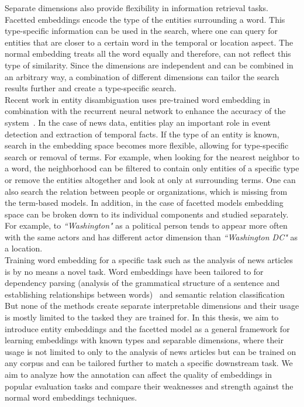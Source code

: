 Separate dimensions also provide flexibility in information retrieval tasks. Facetted embeddings encode the type of the entities surrounding a word. This type-specific information can be used in the search, where one can query for entities that are closer to a certain word in the temporal or location aspect. The normal embedding treats all the word equally and therefore, can not reflect this type of similarity. Since the dimensions are independent and can be combined in an arbitrary way, a combination of different dimensions can tailor the search results further and create a type-specific search. \\
Recent work in entity disambiguation uses pre-trained word embedding in combination with the recurrent neural network to enhance the accuracy of the system~. In the case of news data, entities play an important role in event detection and extraction of temporal facts. If the type of an entity is known, search in the embedding space becomes more flexible, allowing for type-specific search or removal of terms. For example, when looking for the nearest neighbor to a word, the neighborhood can be filtered to contain only entities of a specific type or remove the entities altogether and look at only at surrounding terms. One can also search the relation between people or organizations, which is missing from the term-based models. 
In addition, in the case of facetted models embedding space can be broken down to its individual components and studied separately. For example, to \emph{``Washington"} as a political person tends to appear more often with the same actors and has different actor dimension than \emph{``Washington DC"} as a location.  \\
Training word embedding for a specific task such as the analysis of news articles is by no means a novel task. Word embeddings have been tailored to for dependency parsing (analysis of the grammatical structure of a sentence and establishing relationships between words)~ and semantic relation classification  But none of the methods create separate interpretable dimensions and their usage is mostly limited to the tasked they are trained for. In this thesis, we aim to introduce entity embeddings and the facetted model as a general framework for learning embeddings with known types and separable dimensions, where their usage is not limited to only to the analysis of news articles but can be trained on any corpus and can be tailored further to match a specific downstream task. We aim to analyze how the annotation can affect the quality of embeddings in popular evaluation tasks and compare their weaknesses and strength against the normal word embeddings techniques. 

